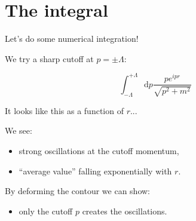 \documentclass[aspectratio=169]{beamer}
\newcommand{\integrand}{\frac{p e^{ipr}}{\sqrt{p^2 + m^2}}}
\newcommand{\diffop}{\mathop{}\!\mathrm{d}}
\newcommand{\dip}{\diffop p}
\begin{document}


\section{The integral}

\begin{frame}
Let's do some numerical integration!
\end{frame}


\begin{frame}
We try a sharp \alert{cutoff} at $p = \pm \Lambda$:

\pause
$$\int_{-\Lambda}^{+\Lambda} \dip \integrand$$

\pause
\bigskip
It looks like this \alert{as a function of $r$}...
\end{frame}





\begin{frame}
We see:

\begin{itemize}
\pause
\item strong \alert{oscillations} at the cutoff momentum,

\pause
\item \alert{``average value''} falling \alert{exponentially} with $r$.
\end{itemize}

\pause
\bigskip
By deforming the contour we can show:

\pause
\begin{itemize}
\item \alert{only} the cutoff $p$ creates the oscillations.
\end{itemize}
\end{frame}
\end{document}
